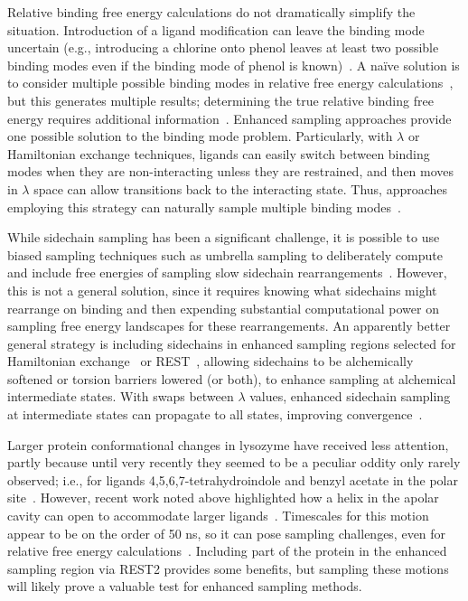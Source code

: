 \documentclass[aps,pre,twocolumn,nofootinbib,superscriptaddress,10pt, final,tightenlines]{revtex4-1}
\begin{document}
Relative binding free energy calculations do not dramatically simplify the situation. 
Introduction of a ligand modification can leave the binding mode uncertain (e.g., introducing a chlorine onto phenol leaves at least two possible binding modes even if the binding mode of phenol is known)~\cite{boyce_predicting_2009}. 
A na{\" i}ve solution is to consider multiple possible binding modes in relative free energy calculations~\cite{boyce_predicting_2009}, but this generates multiple results; determining the true relative binding free energy requires additional information~\cite{mobley_perspective_2012}. Enhanced sampling approaches provide one possible solution to the binding mode problem. 
Particularly, with $\lambda$ or Hamiltonian exchange techniques, ligands can easily switch between binding modes when they are non-interacting unless they are restrained, and then moves in $\lambda$ space can allow transitions back to the interacting state.
Thus, approaches employing this strategy can naturally sample multiple binding modes~\cite{gallicchio_binding_2010, wang_identifying_2013}.

While sidechain sampling has been a significant challenge, it is possible to use biased sampling techniques such as umbrella sampling to deliberately compute and include free energies of sampling slow sidechain rearrangements~\cite{mobley_confine_2007}. 
However, this is not a general solution, since it requires knowing what sidechains might rearrange on binding and then expending substantial computational power on sampling free energy landscapes for these rearrangements. 
An apparently better general strategy is including sidechains in enhanced sampling regions selected for Hamiltonian exchange~\cite{jiang_free_2010, khavrutskii_improved_2011} or REST~\cite{wang_achieving_2012}, allowing sidechains to be alchemically softened or torsion barriers lowered (or both), to enhance sampling at alchemical intermediate states.
With swaps between $\lambda$ values, enhanced sidechain sampling at intermediate states can propagate to all states, improving convergence~\cite{jiang_free_2010, wang_achieving_2012}.

Larger protein conformational changes in lysozyme have received less attention, partly because until very recently they seemed to be a peculiar oddity only rarely observed; i.e., for ligands 4,5,6,7-tetrahydroindole and benzyl acetate in the polar site~\cite{boyce_predicting_2009}. 
However, recent work noted above highlighted how a helix in the apolar cavity can open to accommodate larger ligands~\cite{merski_homologous_2015}. 
Timescales for this motion appear to be on the order of 50 ns, so it can pose sampling challenges, even for relative free energy calculations~\cite{lim_sensitivity_2016}. 
Including part of the protein in the enhanced sampling region via REST2 provides some benefits, but sampling these motions will likely prove a valuable test for enhanced sampling methods.
\end{document}
